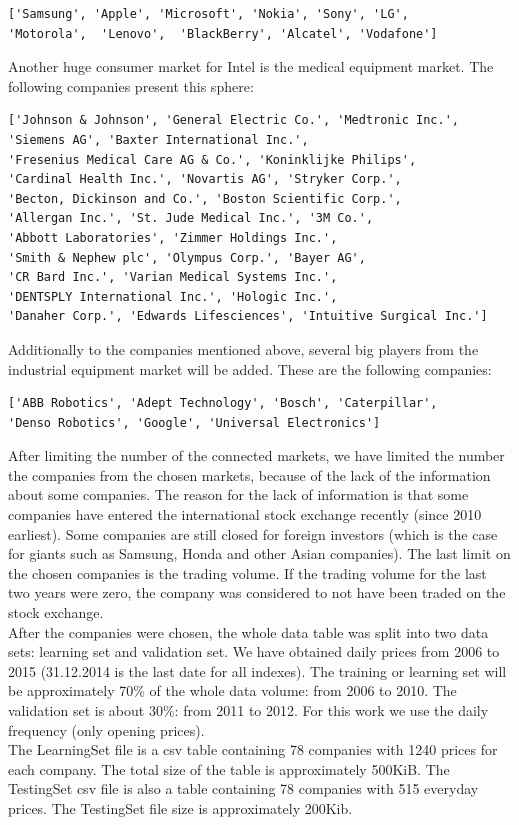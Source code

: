 \documentclass [twoside,
  11pt, a4paper,
  footinclude=true,
  headinclude=true,
  cleardoublepage=empty
]{article}
\begin{document}
\begin{verbatim}
['Samsung', 'Apple', 'Microsoft', 'Nokia', 'Sony', 'LG',
'Motorola',  'Lenovo',  'BlackBerry', 'Alcatel', 'Vodafone']
\end{verbatim} 
Another huge consumer market for Intel is the medical equipment market. The following companies present this sphere:
\begin{verbatim}
['Johnson & Johnson', 'General Electric Co.', 'Medtronic Inc.',
'Siemens AG', 'Baxter International Inc.', 
'Fresenius Medical Care AG & Co.', 'Koninklijke Philips',
'Cardinal Health Inc.', 'Novartis AG', 'Stryker Corp.',
'Becton, Dickinson and Co.', 'Boston Scientific Corp.',
'Allergan Inc.', 'St. Jude Medical Inc.', '3M Co.',
'Abbott Laboratories', 'Zimmer Holdings Inc.', 
'Smith & Nephew plc', 'Olympus Corp.', 'Bayer AG',
'CR Bard Inc.', 'Varian Medical Systems Inc.',
'DENTSPLY International Inc.', 'Hologic Inc.', 
'Danaher Corp.', 'Edwards Lifesciences', 'Intuitive Surgical Inc.']
\end{verbatim}
Additionally to the companies mentioned above, several big players from the industrial equipment market will be added. These are the following companies:
\begin{verbatim} 
['ABB Robotics', 'Adept Technology', 'Bosch', 'Caterpillar',
'Denso Robotics', 'Google', 'Universal Electronics']
\end{verbatim}
After limiting the number of the connected markets, we have limited the number the companies from the chosen markets, because of the lack of the information about some companies. The reason for the lack of information is that some companies have entered the international stock exchange recently (since 2010 earliest). Some companies are still closed for foreign investors (which is the case for giants such as Samsung, Honda and other Asian companies). The last limit on the chosen companies is the trading volume. If  the trading volume for the last two years were zero, the company was considered to not have been traded on the stock exchange.\\
After the companies were chosen, the whole data table was split into two data sets: learning set and validation set. We have obtained daily prices from 2006 to 2015 (31.12.2014 is the last date for all indexes). The training or learning set will be approximately 70\% of the whole data volume: from 2006 to 2010. The validation set is about 30\%: from 2011 to 2012. For this work we use the daily frequency (only opening prices).\\
The LearningSet file is a csv table containing 78 companies with 1240 prices for each company. The total size of the table is approximately 500KiB. The TestingSet csv file is also a table containing 78 companies with 515 everyday prices. The TestingSet file size is approximately 200Kib.\\
\end{document}

